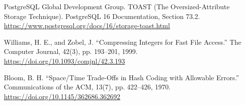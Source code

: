 \begin{enumerate}[label={[\arabic*]},leftmargin=2em,itemsep=0.4em]
\item PostgreSQL Global Development Group. TOAST (The Oversized-Attribute Storage Technique). PostgreSQL 16 Documentation, Section 73.2. \url{https://www.postgresql.org/docs/16/storage-toast.html}
\item Williams, H. E., and Zobel, J. “Compressing Integers for Fast File Access.” The Computer Journal, 42(3), pp. 193--201, 1999. \url{https://doi.org/10.1093/comjnl/42.3.193}
\item Bloom, B. H. “Space/Time Trade-Offs in Hash Coding with Allowable Errors.” Communications of the ACM, 13(7), pp. 422--426, 1970. \url{https://doi.org/10.1145/362686.362692}
\end{enumerate}
